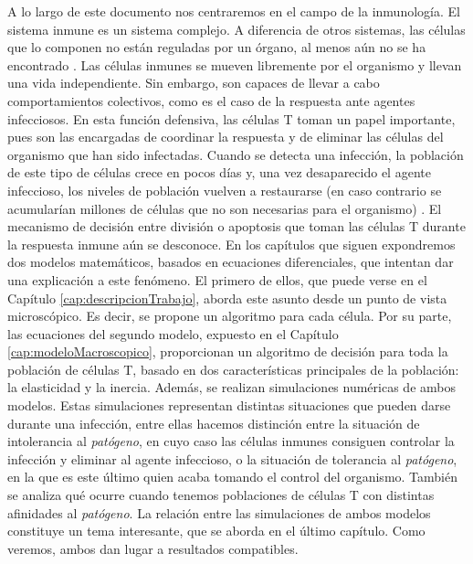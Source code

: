 A lo largo de este documento nos centraremos en el campo de la inmunología. El sistema inmune es un sistema complejo. A diferencia de otros sistemas, las células que lo componen no están reguladas por un órgano, al menos aún no se ha encontrado \citep{arias2016emergent}. Las células inmunes se mueven libremente por el organismo y llevan una vida independiente. Sin embargo, son capaces de llevar a cabo comportamientos colectivos, como es el caso de la respuesta ante agentes infecciosos. En esta función defensiva, las células T toman un papel importante, pues son las encargadas de coordinar la respuesta y de eliminar las células del organismo que han sido infectadas. Cuando se detecta una infección, la población de este tipo de células crece en pocos días y, una vez desaparecido el agente infeccioso, los niveles de población vuelven a restaurarse (en caso contrario se acumularían millones de células que no son necesarias para el organismo) \citep{fernandez2012mecanica}. El mecanismo de decisión entre división o apoptosis que toman las células T durante la respuesta inmune aún se desconoce. En los capítulos que siguen expondremos dos modelos matemáticos, basados en ecuaciones diferenciales, que intentan dar una explicación a este fenómeno. El primero de ellos, que puede verse en el Capítulo \ref{cap:descripcionTrabajo}, aborda este asunto desde un punto de vista microscópico. Es decir, se propone un algoritmo para cada célula. Por su parte, las ecuaciones del segundo modelo, expuesto en el Capítulo \ref{cap:modeloMacroscopico}, proporcionan un algoritmo de decisión para toda la población de células T, basado en dos características principales de la población: la elasticidad y la inercia. Además, se realizan simulaciones numéricas de ambos modelos. Estas simulaciones representan distintas situaciones que pueden darse durante una infección, entre ellas hacemos distinción entre la situación de intolerancia al \textit{patógeno}, en cuyo caso las células inmunes consiguen controlar la infección y eliminar al agente infeccioso, o la situación de tolerancia al \textit{patógeno}, en la que es este último quien acaba tomando el control del organismo. También se analiza qué ocurre cuando tenemos poblaciones de células T con distintas afinidades al \textit{patógeno}. La relación entre las simulaciones de ambos modelos constituye un tema interesante, que se aborda en el último capítulo. Como veremos, ambos dan lugar a resultados compatibles. 




